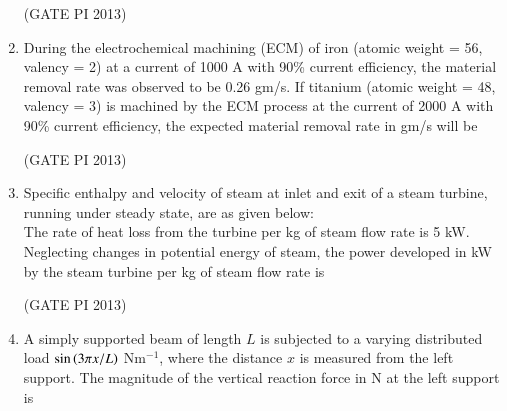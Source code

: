 \documentclass[journal,12pt,onecolumn]{IEEEtran}
\theoremstyle{remark}
\begin{document}
\begin{enumerate}
\hfill (GATE PI 2013)

\item During the electrochemical machining (ECM) of iron (atomic weight = 56, valency = 2) at a current of 1000 A with 90\% current efficiency, the material removal rate was observed to be 0.26 gm/s. If titanium (atomic weight = 48, valency = 3) is machined by the ECM process at the current of 2000 A with 90\% current efficiency, the expected material removal rate in gm/s will be\\


\begin{enumerate}
\end{enumerate}

\hfill (GATE PI 2013)

\item Specific enthalpy and velocity of steam at inlet and exit of a steam turbine, running under steady state, are as given below: \\



\bigskip
The rate of heat loss from the turbine per kg of steam flow rate is 5 kW. Neglecting changes in potential energy of steam, the power developed in kW by the steam turbine per kg of steam flow rate is

\begin{enumerate}
\end{enumerate}

\hfill (GATE PI 2013)

\item A simply supported beam of length $L$ is subjected to a varying distributed load $\sin \left(3\pi x/L\right)$ Nm$^{-1}$, where the distance $x$ is measured from the left support. The magnitude of the vertical reaction force in N at the left support is

\begin{enumerate}
\end{enumerate}


\end{enumerate}
\end{document}
